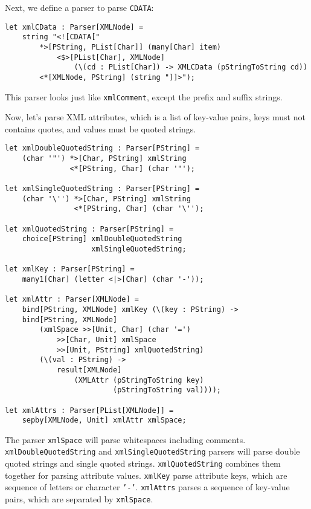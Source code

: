 Next, we define a parser to parse \texttt{CDATA}:

\begin{lstlisting}
let xmlCData : Parser[XMLNode] =
    string "<![CDATA["
        *>[PString, PList[Char]] (many[Char] item)
            <$>[PList[Char], XMLNode]
                (\(cd : PList[Char]) -> XMLCData (pStringToString cd))
        <*[XMLNode, PString] (string "]]>");
\end{lstlisting}

This parser looks just like \texttt{xmlComment}, except the prefix and suffix strings.

Now, let's parse XML attributes, which is a list of key-value pairs, keys must not contains quotes, and values must be quoted strings.

\begin{lstlisting}
let xmlDoubleQuotedString : Parser[PString] =
    (char '"') *>[Char, PString] xmlString
               <*[PString, Char] (char '"');

let xmlSingleQuotedString : Parser[PString] =
    (char '\'') *>[Char, PString] xmlString
                <*[PString, Char] (char '\'');

let xmlQuotedString : Parser[PString] =
    choice[PString] xmlDoubleQuotedString
                    xmlSingleQuotedString;

let xmlKey : Parser[PString] =
    many1[Char] (letter <|>[Char] (char '-'));

let xmlAttr : Parser[XMLNode] =
    bind[PString, XMLNode] xmlKey (\(key : PString) ->
    bind[PString, XMLNode]
        (xmlSpace >>[Unit, Char] (char '=')
            >>[Char, Unit] xmlSpace
            >>[Unit, PString] xmlQuotedString)
        (\(val : PString) ->
            result[XMLNode]
                (XMLAttr (pStringToString key)
                         (pStringToString val))));

let xmlAttrs : Parser[PList[XMLNode]] =
    sepby[XMLNode, Unit] xmlAttr xmlSpace;
\end{lstlisting}

The parser \texttt{xmlSpace} will parse whitespaces including comments. \texttt{xmlDoubleQuotedString} and \texttt{xmlSingleQuotedString} parsers will parse double quoted strings and single quoted strings. \texttt{xmlQuotedString} combines them together for parsing attribute values. \texttt{xmlKey} parse attribute keys, which are sequence of letters or character \texttt{'-'}. \texttt{xmlAttrs} parses a sequence of key-value pairs, which are separated by \texttt{xmlSpace}.


